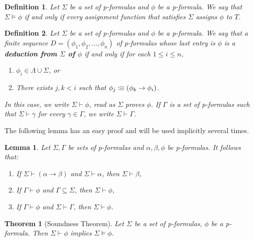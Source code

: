 \documentclass[leqno]{article}
\newtheorem{theorem}{Theorem}[section]
\newtheorem{lemma}{Lemma}[section]
\newtheorem{definition}{Definition}[section]
\newcommand{\proves}{\vdash}
\newcommand{\is}{\colonequiv}
\newcommand{\limplies}{\rightarrow}
\begin{document}
\begin{definition}
    Let $\Sigma$ be a set of p-formulas and $\phi$ be a p-formula. We say that $\Sigma \models \phi$ if and only if every assignment function that satisfies $\Sigma$ assigns $\phi$ to $T$.
\end{definition}

\begin{definition}
    Let $\Sigma$ be a set of p-formulas and $\phi$ be a p-formula. We say that a finite sequence $D = (\phi_1, \phi_2, \dots, \phi_n)$ of p-formulas whose last entry is $\phi$ is a \textbf{deduction from $\Sigma$ of $\phi$} if and only if for each $1 \leq i \leq n$,
    
    \begin{enumerate}
        \item $\phi_i \in \Lambda \cup \Sigma$, or
        \item There exists $j,k < i$ such that $\phi_j \is (\phi_k \limplies \phi_i)$.
    \end{enumerate} In this case, we write $\Sigma \proves \phi$, read as $\Sigma$ proves $\phi$. If $\Gamma$ is a set of p-formulas such that $\Sigma \proves \gamma$ for every $\gamma \in \Gamma$, we write $\Sigma \proves \Gamma$.
\end{definition}

The following lemma has an easy proof and will be used implicitly several times.
\begin{lemma}
    Let $\Sigma, \Gamma$ be sets of p-formulas and $\alpha, \beta, \phi$ be p-formulas. It follows that:
    \begin{enumerate}
        \item If $\Sigma \proves (\alpha \limplies \beta)$ and $\Sigma \proves \alpha$, then $\Sigma \proves \beta$,
    
        \item If $\Gamma \proves \phi$ and $\Gamma \subseteq \Sigma$, then $\Sigma \proves \phi$,
        
        \item If $\Gamma \proves \phi$ and $\Sigma \proves \Gamma$, then $\Sigma \proves \phi$.
    \end{enumerate}
\end{lemma}

\begin{theorem} [Soundness Theorem]
    Let $\Sigma$ be a set of p-formulas, $\phi$ be a p-formula. Then $\Sigma \proves \phi$ implies $\Sigma \models \phi$.
\end{theorem}
\end{document}

